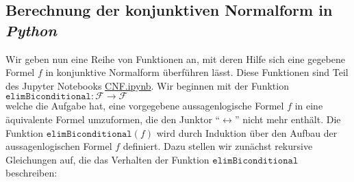 \subsection{Berechnung der konjunktiven Normalform in \textsl{Python}}
Wir geben nun eine Reihe von Funktionen an, mit deren Hilfe sich eine gegebene
Formel $f$ in konjunktive Normalform überführen lässt.  Diese Funktionen sind Teil des Jupyter Notebooks
\href{https://github.com/karlstroetmann/Logic/blob/master/Python/CNF.ipynb}{CNF.ipynb}.
Wir beginnen mit der
Funktion 
\\[0.2cm]
\hspace*{1.3cm}
$\texttt{elimBiconditional}: \mathcal{F} \rightarrow \mathcal{F}$
\\[0.2cm]
welche die Aufgabe hat, eine vorgegebene aussagenlogische Formel $f$ in eine äquivalente Formel
umzuformen, die den Junktor ``$\leftrightarrow$'' nicht mehr enthält.  Die Funktion
$\texttt{elimBiconditional}(f)$ wird durch Induktion über den Aufbau der aussagenlogischen Formel $f$ definiert.
Dazu stellen wir zunächst rekursive Gleichungen auf,
die das Verhalten der Funktion $\texttt{elimBiconditional}$ beschreiben:
